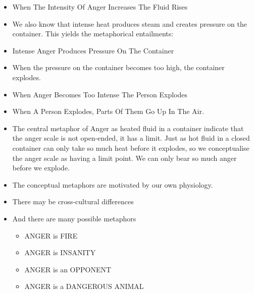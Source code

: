 \documentclass[a4paper,landscape,headrule,footrule,xetex]{foils}
\begin{document}
\begin{itemize}
\item When The Intensity Of Anger Increases The Fluid Rises
\begin{exe}
  \ex {}
  \ex {}
  \ex {}
  \ex {}
  \ex {}
\end{exe}
\newpage
\item We also know that intense heat produces steam and creates pressure on the
container. This yields the metaphorical entailments:
\item Intense Anger Produces Pressure On The Container
  \begin{exe}
    \ex {}
    \ex {}
    \ex {}
    \ex {}
    \ex {}
    \ex {}
    \ex {}
\end{exe}
\newpage
\item  When the pressure on the container becomes too high, the container explodes.
\item When Anger Becomes Too Intense The Person Explodes
  \begin{exe}
    \ex {}
  \ex {}
  \ex {}
  \ex {}
  \ex {}
  \ex {}
\end{exe}
\newpage
\item When A Person Explodes, Parts Of Them Go Up In The Air.
  \begin{exe}
  \ex {}
  \ex {}
  \ex {}
  \ex {}
  \ex {}
\end{exe}

\newpage

\item The central metaphor of Anger as heated fluid in a container indicate
that the anger scale is not open-ended, it has a limit. Just as hot
fluid in a closed container can only take so much heat before it
explodes, so we conceptualise the anger scale as having a limit
point. We can only bear so much anger before we explode.
\item The conceptual metaphors are motivated by our own physiology.
\item There may be cross-cultural differences
\item And there are many possible metaphors

\begin{itemize}
\item ANGER is FIRE
\item ANGER is INSANITY
\item ANGER is an OPPONENT
\item ANGER is a DANGEROUS ANIMAL
\end{itemize}

\end{itemize}
\end{document}

